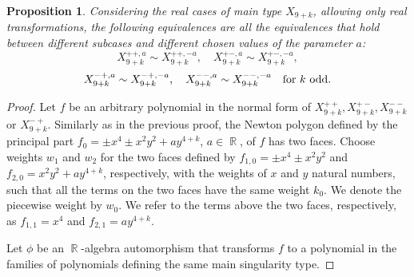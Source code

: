 \documentclass[noend]{amsproc}
\newtheorem{prop}[theorem]{Proposition}
\theoremstyle{definition}
\DeclareMathOperator{\R}{\mathbb{R}}
\begin{document}
\begin{prop}
Considering the real cases of main type $X_{9+k}$, allowing only real transformations, the following equivalences are all the equivalences that hold between different subcases and different chosen values of the parameter $a$:
\[X_{9+k}^{++,a}\sim X_{9+k}^{++,-a},\quad X_{9+k}^{+-,a}\sim X_{9+k}^{+-,-a},\]\[ X_{9+k}^{-+,a}\sim X_{9+k}^{-+,-a},\quad X_{9+k}^{--,a}\sim X_{9+k}^{--,-a}\quad \textnormal{for $k$ odd}.\]
\end{prop}

\begin{proof}
Let $f$ be an arbitrary polynomial in the normal form of $X_{9+k}^{++}, X_{9+k}^{+-}, X_{9+k}^{--}$ or $X_{9+k}^{-+}$. Similarly as in the previous proof, the Newton polygon defined by the principal part $f_0=\pm x^4\pm x^2y^2+ay^{4+k}$, $a\in\R$, of $f$ has two faces. Choose weights $w_1$ and $w_2$ for the two faces defined by $f_{1,0}=\pm x^4\pm x^2y^2$ and $f_{2,0}=x^2y^2+ay^{4+k}$, respectively, with the weights of $x$ and $y$ natural numbers, such that all the terms on the two faces have the same weight $k_0$. We denote the piecewise weight by $w_0$. We refer to the terms above the two faces, respectively, as $f_{1,1}=x^4$ and $f_{2,1}=ay^{4+k}$.

Let $\phi$ be an $\R$-algebra automorphism that transforms $f$ to a polynomial in the families of polynomials defining the same main singularity type.


\end{proof}
\end{document}
